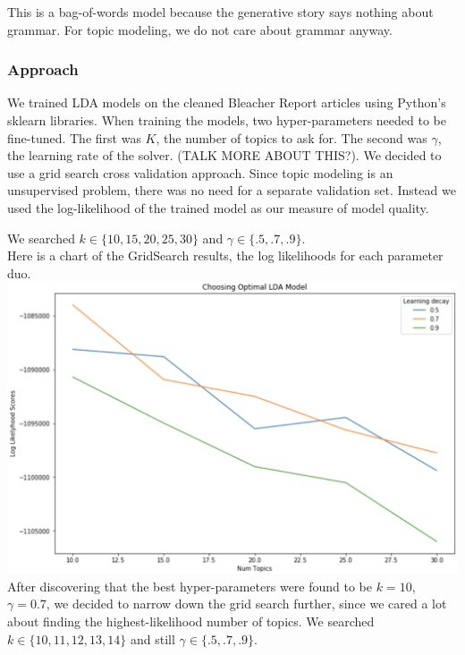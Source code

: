 \documentclass[11pt]{article}
\begin{document}
This is a bag-of-words model because the generative story says nothing about grammar. For topic modeling, we do not care about grammar anyway.    

\subsubsection{Approach}
We trained LDA models on the cleaned Bleacher Report articles using Python's sklearn libraries.  When training the models, two hyper-parameters needed to be fine-tuned. The first was $K$, the number of topics to ask for.  The second was $\gamma$, the learning rate of the solver.  (TALK MORE ABOUT THIS?). We decided to use a grid search cross validation approach. Since topic modeling is an unsupervised problem, there was no need for a separate validation set.  Instead we used the log-likelihood of the trained model as our measure of model quality. 

We searched $k \in \{10, 15, 20, 25, 30\}$ and $\gamma \in \{.5, .7, .9\}$.\\
Here is a chart of the GridSearch results, the log likelihoods for each parameter duo. \\

\includegraphics[width=400pt]{gridsearch.png} \\

After discovering that the best hyper-parameters were found to be $k=10$, $\gamma = 0.7$, we decided to narrow down the grid search further, since we cared a lot about finding the highest-likelihood number of topics.  We searched $k \in \{10, 11, 12, 13, 14\}$ and still $\gamma \in \{.5, .7, .9\}$.
\end{document}
